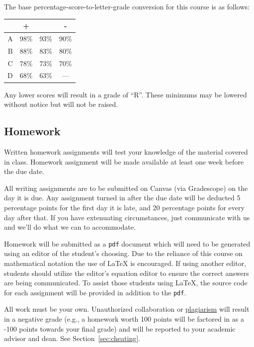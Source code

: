 \documentclass[12pt]{scrartcl}
\begin{document}
The base percentage-score-to-letter-grade conversion for this course is as follows: 

\begin{center}
\begin{tabular}{r|ccc}
 & + & & -\\
 \hline
A & 98\% & 93\% & 90\%\\
B & 88\% & 83\% & 80\%\\
C & 78\% & 73\% & 70\%\\
D & 68\% & 63\% & ---\\
\end{tabular}
\end{center}
Any lower scores will result in a grade of ``R''.
These minimums may be lowered without notice but will not be raised. 

\subsection{Homework}

Written homework assignments will test your knowledge of the material covered in class. 
Homework assignment will be made available at least one week before the due date.

All writing assignments are to be submitted on Canvas (via Gradescope) on the day it is due.  
Any assignment turned in after the due date will be deducted 5 percentage points for the first day it is late, 
and 20 percentage points for every day after that.
If you have extenuating circumstances, just communicate with us and we'll do what we can to accommodate.  

Homework will be submitted as a \texttt{pdf} document which will need to be generated using an editor of the student's choosing. 
Due to the reliance of this course on mathematical notation the use of \LaTeX{} is encouraged. 
If using another editor, students should utilize the editor's equation editor to ensure the correct answers are being communicated. 
To assist those students using \LaTeX, the source code for each assignment will be provided in addition to the \texttt{pdf}.

\begin{tcolorbox}[colback=red!5,colframe=red!75!black,title=Cheating policy]
All work must be your own. Unauthorized collaboration or \href{https://www.cmu.edu/student-affairs/ocsi/}{plagiarism} will result in a negative grade (e.g., a homework worth 100 points will be factored in as a -100 points towards your final grade) and will be reported to your academic advisor and dean.
See Section~\ref{sec:cheating}.
\end{tcolorbox}
\end{document}
